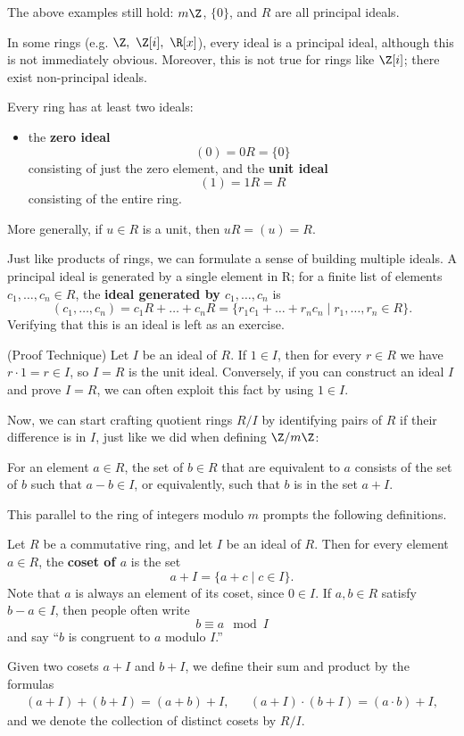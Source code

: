 \documentclass[math1530-lecture-notes]{subfiles}
\begin{document}
The above examples still hold: $m\Z$, $ \{ 0 \}$, and $R$ are all principal ideals.

In some rings (e.g. $\Z,\ \Z[i],\ \R[x]$), every ideal is a principal ideal, although this is not
immediately obvious. Moreover, this is not true for rings like $\Z[i]$; there exist non-principal
ideals.

\begin{example}
  Every ring has at least two ideals:
  \begin{itemize}
    \item the \textbf{zero ideal} \[
      (0)=0R=\{ 0 \}
    \] consisting of just the zero element, and the \textbf{unit ideal}\[
      (1)=1R=R
    \] consisting of the entire ring.
  \end{itemize}
  More generally, if $u\in R$ is a unit, then $uR = (u) = R$.
\end{example}

Just like products of rings, we can formulate a sense of building multiple ideals. A principal ideal
is generated by a single element in R; for a finite list of elements $c_1,\ldots,c_n\in R$, the
\textbf{ideal generated by $c_1,\ldots,c_n$} is \[
  (c_1,\ldots,c_n)=c_1R+\ldots+c_nR=\{r_1c_1+\ldots+r_nc_n\mid r_1,\ldots,r_n\in R\} 
.\] Verifying that this is an ideal is left as an exercise.

\begin{remark}
  (Proof Technique) Let $I$ be an ideal of $R$. If $1\in I$, then for every $r\in R$ we have $r\cdot
  1=r\in I$, so $I=R$ is the unit ideal. Conversely, if you can construct an ideal $I$ and prove
  $I=R$, we can often exploit this fact by using $1\in I$.
\end{remark}

Now, we can start crafting quotient rings $R/I$ by identifying pairs of $R$ if their difference is
in $I$, just like we did when defining $\Z / m\Z$: \begin{center}
  For an element $a\in R$, the set of $b\in R$ that are equivalent to $a$ consists of the set of $b$ 
  such that $a-b\in I$, or equivalently, such that $b$ is in the set $a+I$.
\end{center}
This parallel to the ring of integers modulo $m$ prompts the following definitions.
\begin{definition}{}
  Let $R$ be a commutative ring, and let $I$ be an ideal of $R$. Then for every element $a\in R$,
  the \textbf{coset of $a$} is the set \[
    a+I=\{a+c\mid c\in I\} 
  .\] Note that $a$ is always an element of its coset, since $0\in I$. If $a,b\in R$ satisfy $b-a\in
  I$, then people often write \[
    b \equiv a\mod{I}
  \] and say ``$b$ is congruent to $a$ modulo $I$.''

  Given two cosets $a+I$ and $b+I$, we define their sum and product by the formulas
  \begin{align*}
    (a+I)+(b+I)=(a+b)+I, && (a+I)\cdot (b+I)=(a\cdot b)+I
  ,\end{align*} and we denote the collection of distinct cosets by $R / I$.
\end{definition}
\end{document}
